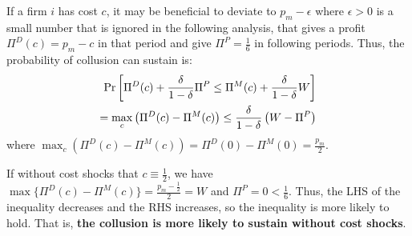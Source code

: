 \documentclass[12pt]{article}
\begin{document}
If a firm $i$ has cost $c$, it may be beneficial to deviate to $p_m-\epsilon$ where $\epsilon>0$ is a small number that is ignored in the following analysis, that gives a profit $\Pi^D(c)=p_m-c$ in that period and give $\Pi^P=\frac{1}{6}$ in following periods. Thus, the probability of collusion can sustain is:
\begin{equation}
    \begin{aligned}
        \textnormal{Pr}\left[\Pi^D(c)+\frac{\delta}{1-\delta}\Pi^P\leq \Pi^M(c)+\frac{\delta}{1-\delta}W\right]\\
        =\max_c\left(\Pi^D(c)-\Pi^M(c)\right)\leq \frac{\delta}{1-\delta}\left(W-\Pi^P\right)\\
        \end{aligned}
        \nonumber
\end{equation}
where $\max_c\left(\Pi^D(c)-\Pi^M(c)\right)=\Pi^D(0)-\Pi^M(0)=\frac{p_m}{2}$.

If without cost shocks that $c\equiv \frac{1}{2}$, we have $\max\{\Pi^D(c)-\Pi^M(c)\}=\frac{p_m-\frac{1}{2}}{2}=W$ and $\Pi^P=0<\frac{1}{6}$. Thus, the LHS of the inequality decreases and the RHS increases, so the inequality is more likely to hold. That is, \textbf{the collusion is more likely to sustain without cost shocks}.
\end{document}
